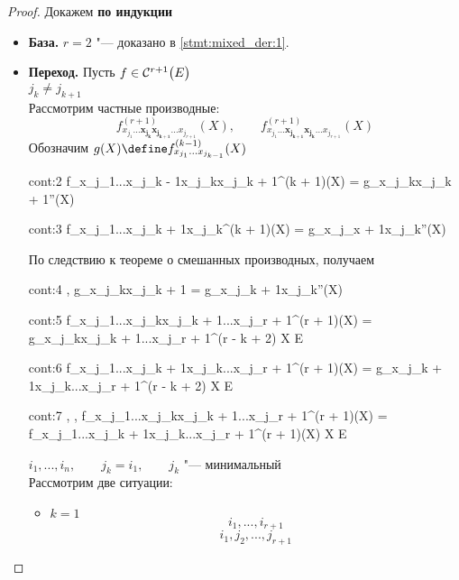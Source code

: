 \begin{proof}
	Докажем \textbf{по индукции}
	\begin{itemize}
		\item \textbf{База.} $ r = 2 $ "--- доказано в \autoref{stmt:mixed_der:1}.
		\item \textbf{Переход.}
		Пусть $ f \in \Cont[r + 1]{E} $ \\
		$ j_k \ne j_{k + 1} $ \\
		Рассмотрим частные производные:
		$$ f_{x_{j_1}...\bm{x_{j_k}x_{j_{k + 1}}}...x_{j_{r + 1}}}^{(r + 1)}(X), \qquad f_{x_{j_1}...\bm{x_{j_{k + 1}}x_{j_k}}...x_{j_{r + 1}}}^{(r + 1)}(X) $$
		Обозначим $ g(X) \define f_{x_{j_1}...x_{j_{k - 1}}}^{(k - 1)}(X) $
		\begin{equ}{cont:2}
			f_{x_{j_1}...x_{j_{k - 1}}x_{j_k}x_{j_{k + 1}}}^{(k + 1)}(X) = g_{x_{j_k}x_{j_{k + 1}}}''(X)
		\end{equ}
		\begin{equ}{cont:3}
			f_{x_{j_1}...x_{j_{k + 1}}x_{j_k}}^{(k + 1)}(X) = g_{x_{j_{x + 1}}x_{j_k}}''(X)
		\end{equ}
		По следствию к теореме о смешанных производных, получаем
		\begin{equ}{cont:4}
			,  \implies  g_{x_{j_k}x_{j_{k + 1}}} = g_{x_{j_{k + 1}}x_{j_k}}''(X)
		\end{equ}
		\begin{equ}{cont:5}
			 \implies f_{x_{j_1}...x_{j_k}x_{j_{k + 1}}...x_{j_{r + 1}}}^{(r + 1)}(X) = g_{x_{j_k}x_{j_{k + 1}}...x_{j_{r + 1}}}^{(r - k + 2)} \quad \forall X \in E
		\end{equ}
		\begin{equ}{cont:6}
			 \implies f_{x_{j_1}...x_{j_{k + 1}}x_{j_k}...x_{j_{r + 1}}}^{(r + 1)}(X) = g_{x_{j_{k + 1}}x_{j_k}...x_{j_{r + 1}}}^{(r - k + 2)} \quad \forall X \in E
		\end{equ}
		\begin{equ}{cont:7}
			, ,  \implies f_{x_{j_1}...x_{j_k}x_{j_{k + 1}}...x_{j_{r + 1}}}^{(r + 1)}(X) = f_{x_{j_1}...x_{j_{k + 1}}x_{j_k}...x_{j_{r + 1}}}^{(r + 1)}(X) \quad \forall X \in E
		\end{equ}
		$ i_1, ..., i_n, \qquad j_k = i_1, \qquad j_k $ "--- минимальный \\
		Рассмотрим две ситуации:
		\begin{itemize}
			\item $ k = 1 $
			$$ i_1, ..., i_{r + 1} $$
			$$ i_1, j_2, ..., j_{r + 1} $$

\end{itemize}
\end{itemize}
\end{proof}
